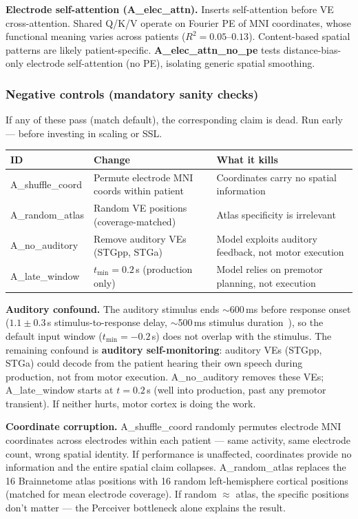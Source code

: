 \documentclass[11pt,letterpaper]{article}
\begin{document}
\textbf{Electrode self-attention (A\_elec\_attn).} Inserts self-attention before VE cross-attention. Shared Q/K/V operate on Fourier PE of MNI coordinates, whose functional meaning varies across patients ($R^2 = 0.05$--$0.13$). Content-based spatial patterns are likely patient-specific. \textbf{A\_elec\_attn\_no\_pe} tests distance-bias-only electrode self-attention (no PE), isolating generic spatial smoothing.

\subsubsection{Negative controls (mandatory sanity checks)}

If any of these pass (match default), the corresponding claim is dead. Run early --- before investing in scaling or SSL.

\begin{table}[ht!]\centering\small
\begin{tabular}{@{}llp{5.5cm}@{}}
\toprule
\textbf{ID} & \textbf{Change} & \textbf{What it kills} \\
\midrule
A\_shuffle\_coord & Permute electrode MNI coords within patient & Coordinates carry no spatial information \\
A\_random\_atlas & Random VE positions (coverage-matched) & Atlas specificity is irrelevant \\
A\_no\_auditory & Remove auditory VEs (STGpp, STGa) & Model exploits auditory feedback, not motor execution \\
A\_late\_window & $t_{\min}{=}0.2$\,s (production only) & Model relies on premotor planning, not execution \\
\bottomrule
\end{tabular}
\end{table}

\textbf{Auditory confound.} The auditory stimulus ends ${\sim}$600\,ms before response onset ($1.1 \pm 0.3$\,s stimulus-to-response delay, ${\sim}$500\,ms stimulus duration~\cite{duraivel2023}), so the default input window ($t_{\min}{=}{-}0.2$\,s) does not overlap with the stimulus. The remaining confound is \textbf{auditory self-monitoring}: auditory VEs (STGpp, STGa) could decode from the patient hearing their own speech during production, not from motor execution. A\_no\_auditory removes these VEs; A\_late\_window starts at $t{=}0.2$\,s (well into production, past any premotor transient). If neither hurts, motor cortex is doing the work.

\textbf{Coordinate corruption.} A\_shuffle\_coord randomly permutes electrode MNI coordinates across electrodes within each patient --- same activity, same electrode count, wrong spatial identity. If performance is unaffected, coordinates provide no information and the entire spatial claim collapses. A\_random\_atlas replaces the 16 Brainnetome atlas positions with 16 random left-hemisphere cortical positions (matched for mean electrode coverage). If random $\approx$ atlas, the specific positions don't matter --- the Perceiver bottleneck alone explains the result.
\end{document}
